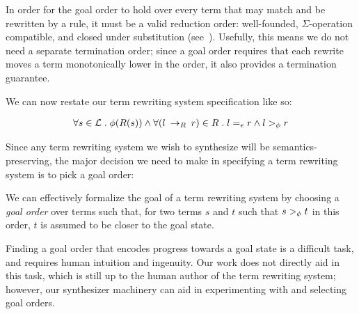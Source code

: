 
In order for the goal order to hold over every term that may match and be rewritten by a rule, it must be a valid reduction order: well-founded, $\Sigma$-operation compatible, and closed under substitution (see~\citep{baader1999term}). Usefully, this means we do not need a separate termination order; since a goal order requires that each rewrite moves a term monotonically lower in the order, it also provides a termination guarantee.

We can now restate our term rewriting system specification like so:

\begin{align*}
    \forall s \in \mathcal{L} \;.\; \phi(R(s)) \wedge \forall (l \:\rightarrow_{R}\: r) \in R \;.\; l =_e r \wedge l >_{\phi} r
\end{align*}

Since any term rewriting system we wish to synthesize will be semantics-preserving, the major decision we need to make in specifying a term rewriting system is to pick a goal order:

\begin{assumption}
We can effectively formalize the goal of a term rewriting system by choosing a \emph{goal order} over terms such that, for two terms $s$ and $t$ such that $s >_{\phi} t$ in this order, $t$ is assumed to be closer to the goal state.
\end{assumption}

Finding a goal order that encodes progress towards a goal state is a difficult task, and requires human intuition and ingenuity. Our work does not directly aid in this task, which is still up to the human author of the term rewriting system; however, our synthesizer machinery can aid in experimenting with and selecting goal orders.

